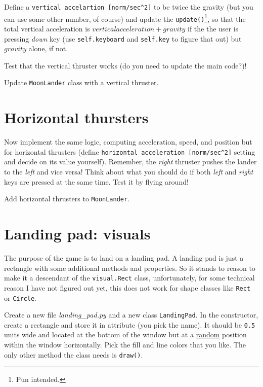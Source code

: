 \documentclass[
]{book}
\begin{document}
Define a \texttt{vertical\ accelartion\ {[}norm/sec\^{}2{]}} to be twice the gravity (but you can use some other number, of course) and update the \texttt{update()}\footnote{Pun intended.}, so that the total vertical acceleration is \(vertical acceleration + gravity\) if the the user is pressing \emph{down} key (use \texttt{self.keyboard} and \texttt{self.key} to figure that out) but \(gravity\) alone, if not.

Test that the vertical thruster works (do you need to update the main code?)!

Update \texttt{MoonLander} class with a vertical thruster.

\hypertarget{horizontal-thursters}{%
\section{Horizontal thursters}\label{horizontal-thursters}}

Now implement the same logic, computing acceleration, speed, and position but for horizontal thrusters (define \texttt{horizontal\ acceleration\ {[}norm/sec\^{}2{]}} setting and decide on its value yourself). Remember, the \emph{right} thruster pushes the lander to the \emph{left} and vice versa! Think about what you should do if both \emph{left} and \emph{right} keys are pressed at the same time. Test it by flying around!

Add horizontal thrusters to \texttt{MoonLander}.

\hypertarget{landing-pad-visuals}{%
\section{Landing pad: visuals}\label{landing-pad-visuals}}

The purpose of the game is to land on a landing pad. A landing pad is just a rectangle with some additional methods and properties. So it stands to reason to make it a descendant of the \texttt{visual.Rect} class, unfortunately, for some technical reason I have not figured out yet, this does not work for shape classes like \texttt{Rect} or \texttt{Circle}.

Create a new file \emph{landing\_pad.py} and a new class \texttt{LandingPad}. In the constructor, create a rectangle and store it in attribute (you pick the name). It should be \texttt{0.5} units wide and located at the bottom of the window but at a \href{https://docs.python.org/3/library/random.html}{random} position within the window horizontally. Pick the fill and line colors that you like. The only other method the class needs is \texttt{draw()}.
\end{document}
